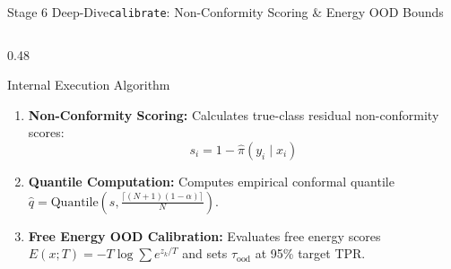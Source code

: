 \begin{frame}{Stage 6 Deep-Dive}{\texttt{calibrate}: Non-Conformity Scoring \& Energy OOD Bounds}
\begin{columns}[T]
\begin{column}{0.48\textwidth}
\begin{block}{Internal Execution Algorithm}
\begin{enumerate}
                    \item \textbf{Non-Conformity Scoring:} Calculates true-class residual non-conformity scores:
                        $$s_i = 1 - \hat{\pi}(y_i \mid x_i)$$
                    \item \textbf{Quantile Computation:} Computes empirical conformal quantile $\hat{q} = \text{Quantile}(s, \frac{\lceil(N+1)(1-\alpha)\rceil}{N})$.
                    \item \textbf{Free Energy OOD Calibration:} Evaluates free energy scores $E(x; T) = -T \log \sum e^{z_k/T}$ and sets $\tau_{\text{ood}}$ at 95\% target TPR.
                \end{enumerate}
            \end{block}
        \end{column}
    \end{columns}


\end{frame}

